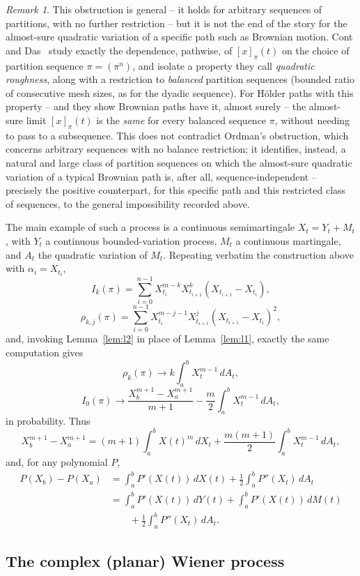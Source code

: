 \documentclass[11pt,fleqn]{article}
\def\ds{\displaystyle}
\theoremstyle{plain}
\theoremstyle{remark}
\newtheorem{remark}[thm]{Remark}
\begin{document}
\begin{remark}
This obstruction is general -- it holds for arbitrary sequences of
partitions, with no further restriction -- but it is not the end of the
story for the almost-sure quadratic variation of a specific path such
as Brownian motion. Cont and Das~\cite{ContDas23} study exactly the
dependence, pathwise, of $[x]_\pi(t)$ on the choice of partition
sequence $\pi=(\pi^n)$, and isolate a property they call
\emph{quadratic roughness}, along with a restriction to
\emph{balanced} partition sequences (bounded ratio of consecutive
mesh sizes, as for the dyadic sequence). For H\"older paths with this
property -- and they show Brownian paths have it, almost surely --
the almost-sure limit $[x]_\pi(t)$ is the \emph{same} for every
balanced sequence $\pi$, without needing to pass to a subsequence.
This does not contradict Ordman's obstruction, which concerns
arbitrary sequences with no balance restriction; it identifies,
instead, a natural and large class of partition sequences on which
the almost-sure quadratic variation of a typical Brownian path is,
after all, sequence-independent -- precisely the positive counterpart,
for this specific path and this restricted class of sequences, to the
general impossibility recorded above.
\end{remark}

The main example of such a process is a continuous semimartingale
$X_t=Y_t+M_t$, with $Y_t$ a continuous bounded-variation process, $M_t$ a
continuous martingale, and $A_t$ the quadratic variation of $M_t$.
Repeating verbatim the construction above with $\alpha_i=X_{t_i}$,
\[
I_k(\pi)=\ds\sum_{i=0}^{n-1}X_{t_i}^{m-k}X_{t_{i+1}}^k(X_{t_{i+1}}-X_{t_i}),
\]
\[
\rho_{k,j}(\pi)=\sum_{i=0}^{n-1}X_{t_i}^{m-j-1}X_{t_{i+1}}^j(X_{t_{i+1}}-X_{t_i})^2,
\]
and, invoking Lemma~\ref{lem:l2} in place of Lemma~\ref{lem:l1}, exactly
the same computation gives
\[
\rho_k(\pi)\longrightarrow k\int_a^bX_t^{m-1}\,dA_t,
\]
\[
I_0(\pi)\longrightarrow\frac{X_b^{m+1}-X_a^{m+1}}{m+1}-\frac m2\int_a^bX_t^{m-1}\,dA_t,
\]
in probability. Thus
\[
X_b^{m+1}-X_a^{m+1}=(m+1)\int_a^bX(t)^m\,dX_t+\frac{m(m+1)}2\int_a^bX_t^{m-1}\,dA_t,
\]
and, for any polynomial $P$,
\begin{align*}
P(X_b)-P(X_a)&=\int_a^bP'(X(t))\,dX(t)+\frac12\int_a^bP''(X_t)\,dA_t\\
&=\int_a^bP'(X(t))\,dY(t)+\int_a^bP'(X(t))\,dM(t)\\
&\qquad+\frac12\int_a^bP''(X_t)\,dA_t.
\end{align*}

\subsection{The complex (planar) Wiener process}
\end{document}
